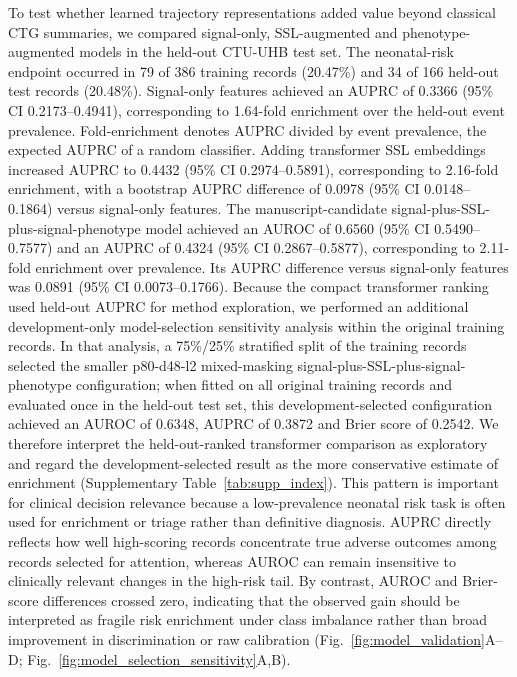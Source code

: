 \documentclass[pdflatex,sn-nature]{sn-jnl}
\begin{document}
To test whether learned trajectory representations added value beyond classical CTG summaries, we compared signal-only, SSL-augmented and phenotype-augmented models in the held-out CTU-UHB test set. The neonatal-risk endpoint occurred in 79 of 386 training records (20.47\%) and 34 of 166 held-out test records (20.48\%). Signal-only features achieved an AUPRC of 0.3366 (95\% CI 0.2173--0.4941), corresponding to 1.64-fold enrichment over the held-out event prevalence. Fold-enrichment denotes AUPRC divided by event prevalence, the expected AUPRC of a random classifier. Adding transformer SSL embeddings increased AUPRC to 0.4432 (95\% CI 0.2974--0.5891), corresponding to 2.16-fold enrichment, with a bootstrap AUPRC difference of 0.0978 (95\% CI 0.0148--0.1864) versus signal-only features. The manuscript-candidate signal-plus-SSL-plus-signal-phenotype model achieved an AUROC of 0.6560 (95\% CI 0.5490--0.7577) and an AUPRC of 0.4324 (95\% CI 0.2867--0.5877), corresponding to 2.11-fold enrichment over prevalence. Its AUPRC difference versus signal-only features was 0.0891 (95\% CI 0.0073--0.1766). Because the compact transformer ranking used held-out AUPRC for method exploration, we performed an additional development-only model-selection sensitivity analysis within the original training records. In that analysis, a 75\%/25\% stratified split of the training records selected the smaller p80-d48-l2 mixed-masking signal-plus-SSL-plus-signal-phenotype configuration; when fitted on all original training records and evaluated once in the held-out test set, this development-selected configuration achieved an AUROC of 0.6348, AUPRC of 0.3872 and Brier score of 0.2542. We therefore interpret the held-out-ranked transformer comparison as exploratory and regard the development-selected result as the more conservative estimate of enrichment (Supplementary Table~\ref{tab:supp_index}). This pattern is important for clinical decision relevance because a low-prevalence neonatal risk task is often used for enrichment or triage rather than definitive diagnosis. AUPRC directly reflects how well high-scoring records concentrate true adverse outcomes among records selected for attention, whereas AUROC can remain insensitive to clinically relevant changes in the high-risk tail. By contrast, AUROC and Brier-score differences crossed zero, indicating that the observed gain should be interpreted as fragile risk enrichment under class imbalance rather than broad improvement in discrimination or raw calibration (Fig.~\ref{fig:model_validation}A--D; Fig.~\ref{fig:model_selection_sensitivity}A,B).
\end{document}
